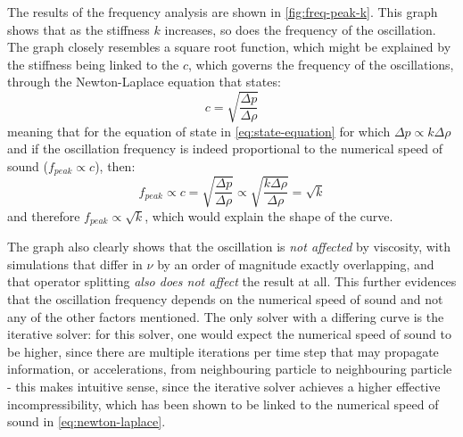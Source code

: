 The results of the frequency analysis are shown in \autoref{fig:freq-peak-k}.
This graph shows that as the stiffness $k$ increases, so does the frequency of the oscillation. The graph closely resembles a square root function, which might be explained by the stiffness being linked to the  $c$, which governs the frequency of the oscillations\autocite*{speed-of-sound-k}, through the Newton-Laplace equation that states\autocite*{speed-of-sound}:
\begin{equation}\label{eq:newton-laplace}
  c = \sqrt{\frac{\Delta p}{\Delta\rho}}
\end{equation}
meaning that for the equation of state in \autoref{eq:state-equation} for which $\Delta p \propto k\Delta\rho$ and if the oscillation frequency is indeed proportional to the numerical speed of sound ($f_{peak} \propto c$), then:
\begin{equation}
  f_{peak}
  \propto c
  = \sqrt{\frac{\Delta p}{\Delta\rho}}
  \propto \sqrt{\frac{k \Delta\rho}{\Delta\rho}}
  = \sqrt{k}
\end{equation}
and therefore $f_{peak} \propto \sqrt{k}$, which would explain the shape of the curve.

The graph also clearly shows that the oscillation is \textit{not affected} by viscosity, with simulations that differ in $\nu$ by an order of magnitude exactly overlapping, and that operator splitting \textit{also does not affect} the result at all. This further evidences that the oscillation frequency depends on the numerical speed of sound and not any of the other factors mentioned. The only solver with a differing curve is the iterative solver: for this solver, one would expect the numerical speed of sound to be higher, since there are multiple iterations per time step that may propagate information, or accelerations, from neighbouring particle to neighbouring particle - this makes intuitive sense, since the iterative solver achieves a higher effective incompressibility, which has been shown to be linked to the numerical speed of sound in \autoref{eq:newton-laplace}.


